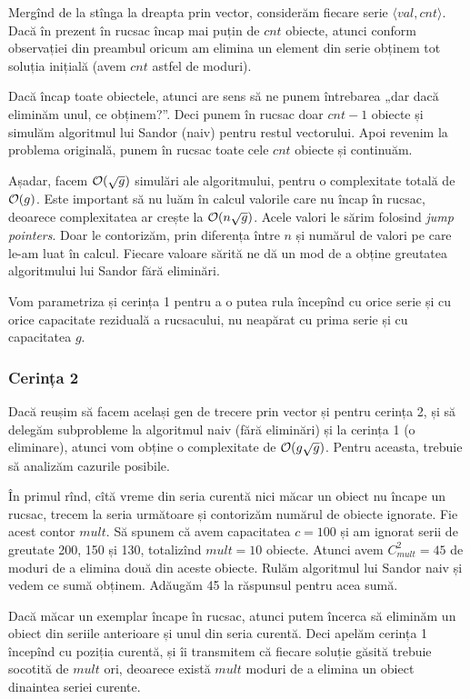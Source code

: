 \documentclass[../main.tex]{subfiles}
\begin{document}
Mergînd de la stînga la dreapta prin vector, considerăm fiecare serie $\langle val, cnt \rangle$. Dacă în prezent în rucsac încap mai puțin de $cnt$ obiecte, atunci conform observației din preambul oricum am elimina un element din serie obținem tot soluția inițială (avem $cnt$ astfel de moduri).

Dacă încap toate obiectele, atunci are sens să ne punem întrebarea „dar dacă eliminăm unul, ce obținem?”. Deci punem în rucsac doar $cnt-1$ obiecte și simulăm algoritmul lui Sandor (naiv) pentru restul vectorului. Apoi revenim la problema originală, punem în rucsac toate cele $cnt$ obiecte și continuăm.

Așadar, facem $\mathcal{O}(\sqrt{g})$ simulări ale algoritmului, pentru o complexitate totală de $\mathcal{O}(g)$. Este important să nu luăm în calcul valorile care nu încap în rucsac, deoarece complexitatea ar crește la $\mathcal{O}(n \sqrt{g})$. Acele valori le sărim folosind \textit{jump pointers}. Doar le contorizăm, prin diferența între $n$ și numărul de valori pe care le-am luat în calcul. Fiecare valoare sărită ne dă un mod de a obține greutatea algoritmului lui Sandor fără eliminări.

Vom parametriza și cerința 1 pentru a o putea rula începînd cu orice serie și cu orice capacitate reziduală a rucsacului, nu neapărat cu prima serie și cu capacitatea $g$.

\subsubsection*{Cerința 2}

Dacă reușim să facem același gen de trecere prin vector și pentru cerința 2, și să delegăm subprobleme la algoritmul naiv (fără eliminări) și la cerința 1 (o eliminare), atunci vom obține o complexitate de $\mathcal{O}(g \sqrt{g})$. Pentru aceasta, trebuie să analizăm cazurile posibile.

În primul rînd, cîtă vreme din seria curentă nici măcar un obiect nu încape un rucsac, trecem la seria următoare și contorizăm numărul de obiecte ignorate. Fie acest contor $mult$. Să spunem că avem capacitatea $c=100$ și am ignorat serii de greutate 200, 150 și 130, totalizînd $mult=10$ obiecte. Atunci avem $C_{mult}^2 = 45$ de moduri de a elimina două din aceste obiecte. Rulăm algoritmul lui Sandor naiv și vedem ce sumă obținem. Adăugăm 45 la răspunsul pentru acea sumă.

Dacă măcar un exemplar încape în rucsac, atunci putem încerca să eliminăm un obiect din seriile anterioare și unul din seria curentă. Deci apelăm cerința 1 începînd cu poziția curentă, și îi transmitem că fiecare soluție găsită trebuie socotită de $mult$ ori, deoarece există $mult$ moduri de a elimina un obiect dinaintea seriei curente.
\end{document}

